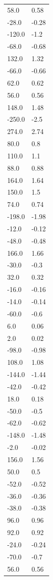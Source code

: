 \begin{longtable}{ll}
58.0 & 0.58 \\
-28.0 & -0.28 \\
-120.0 & -1.2 \\
-68.0 & -0.68 \\
132.0 & 1.32 \\
-66.0 & -0.66 \\
62.0 & 0.62 \\
56.0 & 0.56 \\
148.0 & 1.48 \\
-250.0 & -2.5 \\
274.0 & 2.74 \\
80.0 & 0.8 \\
110.0 & 1.1 \\
88.0 & 0.88 \\
164.0 & 1.64 \\
150.0 & 1.5 \\
74.0 & 0.74 \\
-198.0 & -1.98 \\
-12.0 & -0.12 \\
-48.0 & -0.48 \\
166.0 & 1.66 \\
-30.0 & -0.3 \\
32.0 & 0.32 \\
-16.0 & -0.16 \\
-14.0 & -0.14 \\
-60.0 & -0.6 \\
6.0 & 0.06 \\
2.0 & 0.02 \\
-98.0 & -0.98 \\
108.0 & 1.08 \\
-144.0 & -1.44 \\
-42.0 & -0.42 \\
18.0 & 0.18 \\
-50.0 & -0.5 \\
-62.0 & -0.62 \\
-148.0 & -1.48 \\
-2.0 & -0.02 \\
156.0 & 1.56 \\
50.0 & 0.5 \\
-52.0 & -0.52 \\
-36.0 & -0.36 \\
-38.0 & -0.38 \\
96.0 & 0.96 \\
92.0 & 0.92 \\
-24.0 & -0.24 \\
-70.0 & -0.7 \\
56.0 & 0.56 \\

\end{longtable}
